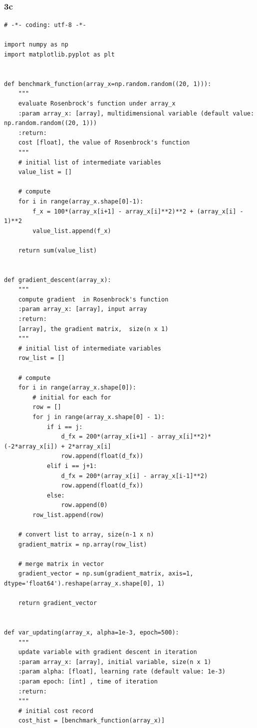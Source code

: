 \documentclass{article}
\begin{document}
\subsubsection*{3c}
\begin{lstlisting}
# -*- coding: utf-8 -*-

import numpy as np
import matplotlib.pyplot as plt


def benchmark_function(array_x=np.random.random((20, 1))):
    """
    evaluate Rosenbrock's function under array_x
    :param array_x: [array], multidimensional variable (default value: np.random.random((20, 1)))
    :return:
    cost [float], the value of Rosenbrock's function
    """
    # initial list of intermediate variables
    value_list = []

    # compute
    for i in range(array_x.shape[0]-1):
        f_x = 100*(array_x[i+1] - array_x[i]**2)**2 + (array_x[i] - 1)**2
        value_list.append(f_x)

    return sum(value_list)


def gradient_descent(array_x):
    """
    compute gradient  in Rosenbrock's function
    :param array_x: [array], input array
    :return:
    [array], the gradient matrix,  size(n x 1)
    """
    # initial list of intermediate variables
    row_list = []

    # compute
    for i in range(array_x.shape[0]):
        # initial for each for
        row = []
        for j in range(array_x.shape[0] - 1):
            if i == j:
                d_fx = 200*(array_x[i+1] - array_x[i]**2)*(-2*array_x[i]) + 2*array_x[i]
                row.append(float(d_fx))
            elif i == j+1:
                d_fx = 200*(array_x[i] - array_x[i-1]**2)
                row.append(float(d_fx))
            else:
                row.append(0)
        row_list.append(row)

    # convert list to array, size(n-1 x n)
    gradient_matrix = np.array(row_list)

    # merge matrix in vector
    gradient_vector = np.sum(gradient_matrix, axis=1, dtype='float64').reshape(array_x.shape[0], 1)

    return gradient_vector


def var_updating(array_x, alpha=1e-3, epoch=500):
    """
    update variable with gradient descent in iteration
    :param array_x: [array], initial variable, size(n x 1)
    :param alpha: [float], learning rate (default value: 1e-3)
    :param epoch: [int] , time of iteration
    :return:
    """
    # initial cost record
    cost_hist = [benchmark_function(array_x)]


\end{lstlisting}
\end{document}
